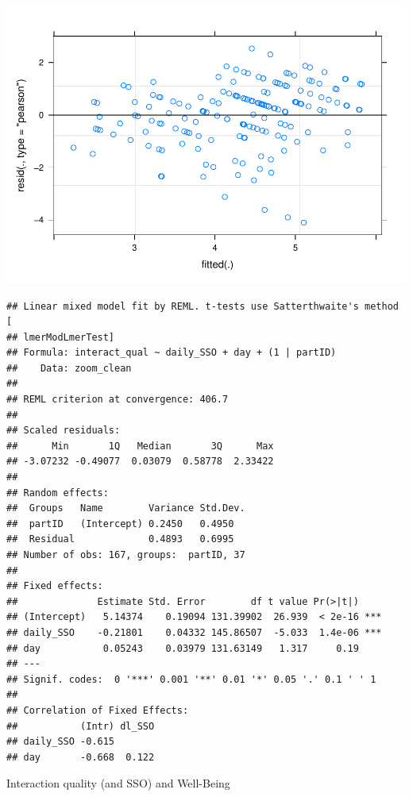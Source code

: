\documentclass[
  english,
  man]{apa7}
\begin{document}
\includegraphics{zoom_sso_manuscript_files/figure-latex/unnamed-chunk-9-1.pdf}

\begin{verbatim}
## Linear mixed model fit by REML. t-tests use Satterthwaite's method [
## lmerModLmerTest]
## Formula: interact_qual ~ daily_SSO + day + (1 | partID)
##    Data: zoom_clean
## 
## REML criterion at convergence: 406.7
## 
## Scaled residuals: 
##      Min       1Q   Median       3Q      Max 
## -3.07232 -0.49077  0.03079  0.58778  2.33422 
## 
## Random effects:
##  Groups   Name        Variance Std.Dev.
##  partID   (Intercept) 0.2450   0.4950  
##  Residual             0.4893   0.6995  
## Number of obs: 167, groups:  partID, 37
## 
## Fixed effects:
##              Estimate Std. Error        df t value Pr(>|t|)    
## (Intercept)   5.14374    0.19094 131.39902  26.939  < 2e-16 ***
## daily_SSO    -0.21801    0.04332 145.86507  -5.033  1.4e-06 ***
## day           0.05243    0.03979 131.63149   1.317     0.19    
## ---
## Signif. codes:  0 '***' 0.001 '**' 0.01 '*' 0.05 '.' 0.1 ' ' 1
## 
## Correlation of Fixed Effects:
##           (Intr) dl_SSO
## daily_SSO -0.615       
## day       -0.668  0.122
\end{verbatim}

Interaction quality (and SSO) and Well-Being
\end{document}
